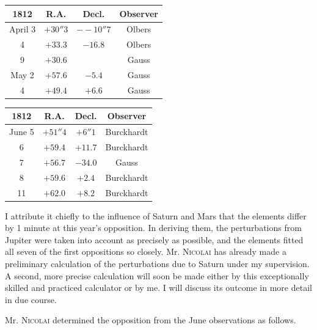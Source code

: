\begin{center}\fontsize{10}{12}\selectfont\setlength{\tabcolsep}{6pt}\renewcommand{\arraystretch}{1.15}\begin{tabular}{c|c|c|c}
1812 & R.A. & Decl. & Observer\\\hline
April 3 & $+30''3$ & $-\!-10''7$ & Olbers\\
4 & $+33.3$ & $-16.8$ & Olbers\\
9 & $+30.6$ &  & Gauss\\
May 2 & $+57.6$ & $-5.4$ & Gauss\\
4 & $+49.4$ & $+6.6$ & Gauss\\
\end{tabular}\end{center}
\begin{center}\fontsize{10}{12}\selectfont\setlength{\tabcolsep}{6pt}\renewcommand{\arraystretch}{1.15}\begin{tabular}{c|c|c|c}
1812 & R.A. & Decl. & Observer\\\hline
June 5 & $+51''4$ & $+6''1$ & Burckhardt\\
6 & $+59.4$ & $+11.7$ & Burckhardt\\
7 & $+56.7$ & $-34.0$ & Gauss\\
8 & $+59.6$ & $+2.4$ & Burckhardt\\
11 & $+62.0$ & $+8.2$ & Burckhardt\\
\end{tabular}\end{center}

\par\indent I attribute it chiefly to the influence of Saturn and Mars that the elements differ by 1 minute at this year’s opposition. In deriving them, the perturbations from Jupiter were taken into account as precisely as possible, and the elements fitted all seven of the first oppositions so closely. Mr. \textsc{Nicolai} has already made a preliminary calculation of the perturbations due to Saturn under my supervision. A second, more precise calculation will soon be made either by this exceptionally skilled and practiced calculator or by me. I will discuss its outcome in more detail in due course.

\par\indent Mr. \textsc{Nicolai} determined the opposition from the June observations as follows.

